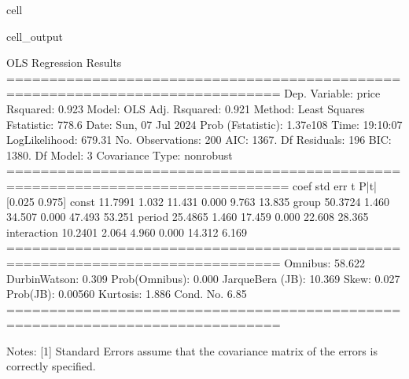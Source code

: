 \documentclass[letterpaper,10pt,english]{jupyterBook}
\begin{document}
\begin{sphinxuseclass}{cell}
\begin{sphinxVerbatimOutput}
\begin{sphinxuseclass}{cell_output}
\begin{sphinxVerbatim}[commandchars=\\\{\}]
                            OLS Regression Results                            
==============================================================================
Dep. Variable:                  price   R\PYGZhy{}squared:                       0.923
Model:                            OLS   Adj. R\PYGZhy{}squared:                  0.921
Method:                 Least Squares   F\PYGZhy{}statistic:                     778.6
Date:                Sun, 07 Jul 2024   Prob (F\PYGZhy{}statistic):          1.37e\PYGZhy{}108
Time:                        19:10:07   Log\PYGZhy{}Likelihood:                \PYGZhy{}679.31
No. Observations:                 200   AIC:                             1367.
Df Residuals:                     196   BIC:                             1380.
Df Model:                           3                                         
Covariance Type:            nonrobust                                         
===============================================================================
                  coef    std err          t      P\PYGZgt{}|t|      [0.025      0.975]
\PYGZhy{}\PYGZhy{}\PYGZhy{}\PYGZhy{}\PYGZhy{}\PYGZhy{}\PYGZhy{}\PYGZhy{}\PYGZhy{}\PYGZhy{}\PYGZhy{}\PYGZhy{}\PYGZhy{}\PYGZhy{}\PYGZhy{}\PYGZhy{}\PYGZhy{}\PYGZhy{}\PYGZhy{}\PYGZhy{}\PYGZhy{}\PYGZhy{}\PYGZhy{}\PYGZhy{}\PYGZhy{}\PYGZhy{}\PYGZhy{}\PYGZhy{}\PYGZhy{}\PYGZhy{}\PYGZhy{}\PYGZhy{}\PYGZhy{}\PYGZhy{}\PYGZhy{}\PYGZhy{}\PYGZhy{}\PYGZhy{}\PYGZhy{}\PYGZhy{}\PYGZhy{}\PYGZhy{}\PYGZhy{}\PYGZhy{}\PYGZhy{}\PYGZhy{}\PYGZhy{}\PYGZhy{}\PYGZhy{}\PYGZhy{}\PYGZhy{}\PYGZhy{}\PYGZhy{}\PYGZhy{}\PYGZhy{}\PYGZhy{}\PYGZhy{}\PYGZhy{}\PYGZhy{}\PYGZhy{}\PYGZhy{}\PYGZhy{}\PYGZhy{}\PYGZhy{}\PYGZhy{}\PYGZhy{}\PYGZhy{}\PYGZhy{}\PYGZhy{}\PYGZhy{}\PYGZhy{}\PYGZhy{}\PYGZhy{}\PYGZhy{}\PYGZhy{}\PYGZhy{}\PYGZhy{}\PYGZhy{}\PYGZhy{}
const          11.7991      1.032     11.431      0.000       9.763      13.835
group          50.3724      1.460     34.507      0.000      47.493      53.251
period         25.4865      1.460     17.459      0.000      22.608      28.365
interaction   \PYGZhy{}10.2401      2.064     \PYGZhy{}4.960      0.000     \PYGZhy{}14.312      \PYGZhy{}6.169
==============================================================================
Omnibus:                       58.622   Durbin\PYGZhy{}Watson:                   0.309
Prob(Omnibus):                  0.000   Jarque\PYGZhy{}Bera (JB):               10.369
Skew:                          \PYGZhy{}0.027   Prob(JB):                      0.00560
Kurtosis:                       1.886   Cond. No.                         6.85
==============================================================================

Notes:
[1] Standard Errors assume that the covariance matrix of the errors is correctly specified.
\end{sphinxVerbatim}

\end{sphinxuseclass}\end{sphinxVerbatimOutput}

\end{sphinxuseclass}
\end{document}
